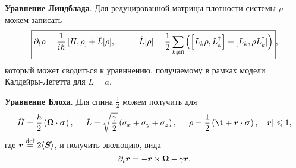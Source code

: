 \textbf{Уравнение Линдблада}. Для редуцированной матрицы плотности системы $\rho$ можем записать
\begin{equation}
	\boxed{
		\partial_t \rho = \frac{1}{i\hbar} \left[H, \rho\right] + \hat{L}[\rho],
		\hspace{10 mm} 
		\hat{L}[\rho] = 
		\frac{1}{2} \sum_{k\neq 0} \left(
			\left[L_k \rho, L_k\con\right]
			+
			[L_k, \rho L_k\con]
		\right)
	},
\end{equation}
который может сводиться к уравннению, получаемому в рамках модели Калдейры-Легетта для $L = a$.

\textbf{Уравнение Блоха}. Для спина $\frac{1}{2}$ можем получить для
\begin{equation*}
	\hat{H} = \frac{\hbar}{2} \left(\vc{\Omega} \cdot \vc{\sigma}\right),
	\hspace{5 mm} 
	\hat{L} = \sqrt{\frac{\gamma}{2}} \left(\sigma_x + \sigma_y + \sigma_z\right),
	\hspace{5 mm} 
	\rho = \frac{1}{2}\left(\1 + \vc{r} \cdot \vc{\sigma} \right), \hspace{2.5 mm} |\vc{r}|\leq 1,
\end{equation*}
где $\boldsymbol{r} \overset{\mathrm{def}}{=} 2 \langle \boldsymbol{S}\rangle$, и получить эволюцию, вида
\begin{equation*}
	\partial_t \boldsymbol{r} = - \boldsymbol{r} \times \boldsymbol{\Omega} - \gamma \boldsymbol{r}.
\end{equation*}